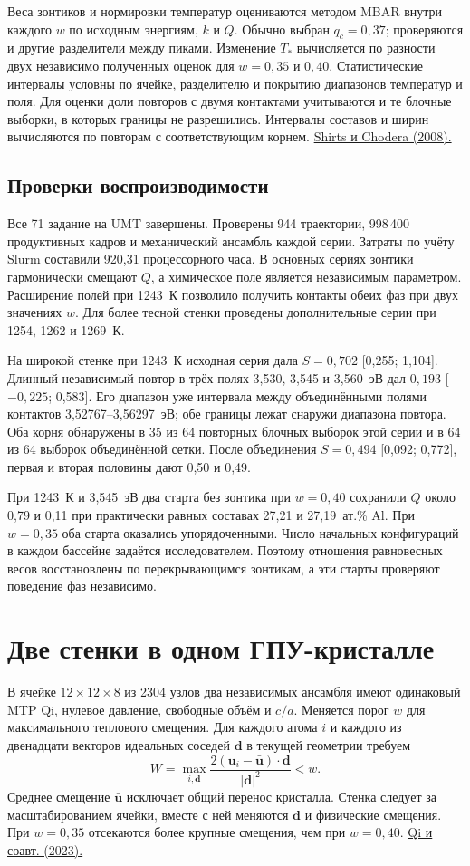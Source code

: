 \documentclass[11pt,a4paper]{article}
\begin{document}
Веса зонтиков и нормировки температур оцениваются методом MBAR внутри каждого \(w\) по исходным энергиям, \(k\) и \(Q\). Обычно выбран \(q_c=0{,}37\); проверяются и другие разделители между пиками. Изменение \(T_*\) вычисляется по разности двух независимо полученных оценок для \(w=0{,}35\) и \(0{,}40\). Статистические интервалы условны по ячейке, разделителю и покрытию диапазонов температур и поля. Для оценки доли повторов с двумя контактами учитываются и те блочные выборки, в которых границы не разрешились. Интервалы составов и ширин вычисляются по повторам с соответствующим корнем. \href{https://doi.org/10.1063/1.2978177}{Shirts и Chodera (2008).}
\subsection*{Проверки воспроизводимости}
Все 71 задание на UMT завершены. Проверены 944 траектории, 998\,400 продуктивных кадров и механический ансамбль каждой серии. Затраты по учёту Slurm составили 920,31 процессорного часа. В основных сериях зонтики гармонически смещают \(Q\), а химическое поле является независимым параметром. Расширение полей при 1243~К позволило получить контакты обеих фаз при двух значениях \(w\). Для более тесной стенки проведены дополнительные серии при 1254, 1262 и 1269~К.

На широкой стенке при 1243~К исходная серия дала \(S=0{,}702\) [0,255; 1,104]. Длинный независимый повтор в трёх полях 3,530, 3,545 и 3,560~эВ дал \(0{,}193\) [\(-0{,}225\); 0,583]. Его диапазон уже интервала между объединёнными полями контактов 3,52767--3,56297~эВ; обе границы лежат снаружи диапазона повтора. Оба корня обнаружены в 35 из 64 повторных блочных выборок этой серии и в 64 из 64 выборок объединённой сетки. После объединения \(S=0{,}494\) [0,092; 0,772], первая и вторая половины дают 0,50 и 0,49.

При 1243~К и 3,545~эВ два старта без зонтика при \(w=0{,}40\) сохранили \(Q\) около 0,79 и 0,11 при практически равных составах 27,21 и 27,19~ат.\% Al. При \(w=0{,}35\) оба старта оказались упорядоченными. Число начальных конфигураций в каждом бассейне задаётся исследователем. Поэтому отношения равновесных весов восстановлены по перекрывающимся зонтикам, а эти старты проверяют поведение фаз независимо.
\clearpage
\section*{Две стенки в одном ГПУ-кристалле}
В ячейке \(12\times12\times8\) из 2304 узлов два независимых ансамбля имеют одинаковый MTP Qi, нулевое давление, свободные объём и \(c/a\). Меняется порог \(w\) для максимального теплового смещения. Для каждого атома \(i\) и каждого из двенадцати векторов идеальных соседей \(\mathbf d\) в текущей геометрии требуем
\[
 W=\max_{i,\mathbf d}\frac{2(\mathbf u_i-\bar{\mathbf u})\cdot\mathbf d}{|\mathbf d|^2}<w.
\]
Среднее смещение \(\bar{\mathbf u}\) исключает общий перенос кристалла. Стенка следует за масштабированием ячейки, вместе с ней меняются \(\mathbf d\) и физические смещения. При \(w=0{,}35\) отсекаются более крупные смещения, чем при \(w=0{,}40\). \href{https://doi.org/10.1103/PhysRevMaterials.7.103602}{Qi и соавт. (2023).}
\end{document}
